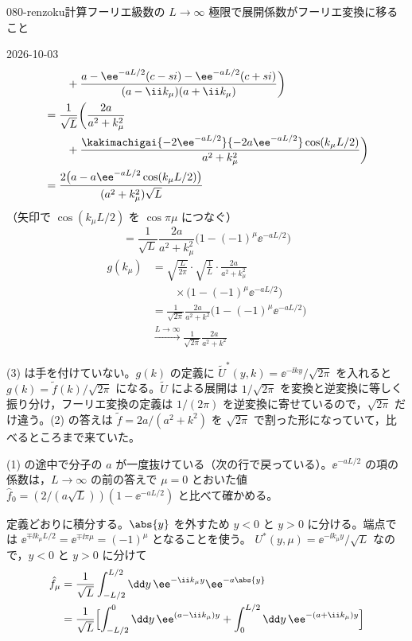 \documentclass[uplatex,dvipdfmx,a4paper,11pt]{jsarticle}
\begin{document}
\begin{mondai}{080-renzoku}{計算}{フーリエ級数の $L\to\infty$ 極限で展開係数がフーリエ変換に移ること}
\begin{kotaeutsushi}{2026-10-03}
\begin{align*}
  &\qquad+\frac{a-\ee^{-aL/2}(c-si)-\ee^{-aL/2}(c+si)}{(a-\ii k_\mu)(a+\ii k_\mu)}\biggr)\\
  &=\frac{1}{\sqrt L}\biggl(\frac{2a}{a^{2}+k_\mu^{2}}\\
  &\qquad+\frac{\kakimachigai{-2\ee^{-aL/2}}{-2a\ee^{-aL/2}}\cos(k_\mu L/2)}{a^{2}+k_\mu^{2}}\biggr)\\
  &=\frac{2\bigl(a-a\ee^{-aL/2}\cos(k_\mu L/2)\bigr)}{(a^{2}+k_\mu^{2})\sqrt L}
\end{align*}
（矢印で $\cos(k_\mu L/2)$ を $\cos\pi\mu$ につなぐ）
\[ =\frac{1}{\sqrt L}\frac{2a}{a^{2}+k_\mu^{2}}\bigl(1-(-1)^{\mu}\ee^{-aL/2}\bigr) \]
\begin{align*}
  g(k_\mu)&=\sqrt{\frac{L}{2\pi}}\cdot\sqrt{\frac{1}{L}}\cdot\frac{2a}{a^{2}+k_\mu^{2}}\\
  &\qquad\times\bigl(1-(-1)^{\mu}\ee^{-aL/2}\bigr)\\
  &=\frac{1}{\sqrt{2\pi}}\frac{2a}{a^{2}+k^{2}}\bigl(1-(-1)^{\mu}\ee^{-aL/2}\bigr)\\
  &\xrightarrow{L\to\infty}\frac{1}{\sqrt{2\pi}}\frac{2a}{a^{2}+k^{2}}
\end{align*}
\mikai
\end{kotaeutsushi}
\begin{kizuki}
\item (3) は手を付けていない。$g(k)$ の定義に $\tilde U^{*}(y,k)=\ee^{-\ii ky}/\sqrt{2\pi}$ を入れると $g(k)=\tilde f(k)/\sqrt{2\pi}$ になる。$\tilde U$ による展開は $1/\sqrt{2\pi}$ を変換と逆変換に等しく振り分け，フーリエ変換の定義は $1/(2\pi)$ を逆変換に寄せているので，$\sqrt{2\pi}$ だけ違う。(2) の答えは $\tilde f=2a/(a^{2}+k^{2})$ を $\sqrt{2\pi}$ で割った形になっていて，比べるところまで来ていた。
\item (1) の途中で分子の $a$ が一度抜けている（次の行で戻っている）。$\ee^{-aL/2}$ の項の係数は，$L\to\infty$ の前の答えで $\mu=0$ とおいた値 $\hat f_0=(2/(a\sqrt L))(1-\ee^{-aL/2})$ と比べて確かめる。
\end{kizuki}
\begin{tadashii}
\houshin 定義どおりに積分する。$\abs{y}$ を外すため $y<0$ と $y>0$ に分ける。端点では $\ee^{\mp\ii k_\mu L/2}=\ee^{\mp\ii\pi\mu}=(-1)^{\mu}$ となることを使う。
\keisan
{} $U^{*}(y,\mu)=\ee^{-\ii k_\mu y}/\sqrt{L}$ なので，$y<0$ と $y>0$ に分けて
\begin{align*}
  \hat f_\mu&=\frac{1}{\sqrt L}\int_{-L/2}^{L/2}\dd y\,\ee^{-\ii k_\mu y}\ee^{-a\abs{y}}\\
  &=\frac{1}{\sqrt L}\Bigl[\int_{-L/2}^{0}\dd y\,\ee^{(a-\ii k_\mu)y}+\int_{0}^{L/2}\dd y\,\ee^{-(a+\ii k_\mu)y}\Bigr]

\end{align*}
\end{tadashii}
\end{mondai}
\end{document}
